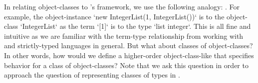 
In relating object-classes to \LangA's framework, we use the following analogy:
.
For example,
the object-instance \code`new IntegerList(1, IntegerList())` is to
the object-class \code`IntegerList` as
the term \code`[1]` is to
the type \code`list integer`.
This is all fine and intuitive as we are familiar with the term-type relationship from working with \LangA and strictly-typed languages in general.
But what about classes of object-classes?
In other words, how would we define a higher-order object-class-like that specifies behavior for a class of object-classes?
Note that we ask this question in order to approach the question of representing classes of types in \LangA.


